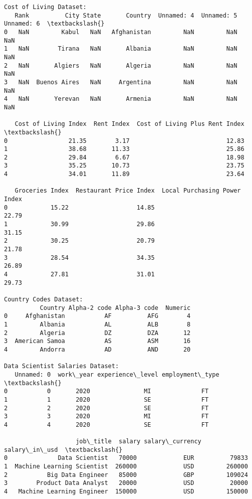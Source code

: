 \documentclass[11pt]{article}
\begin{document}
    \begin{Verbatim}[commandchars=\\\{\}]
Cost of Living Dataset:
   Rank          City State       Country  Unnamed: 4  Unnamed: 5  Unnamed: 6  \textbackslash{}
0   NaN         Kabul   NaN   Afghanistan         NaN         NaN         NaN
1   NaN        Tirana   NaN       Albania         NaN         NaN         NaN
2   NaN       Algiers   NaN       Algeria         NaN         NaN         NaN
3   NaN  Buenos Aires   NaN     Argentina         NaN         NaN         NaN
4   NaN       Yerevan   NaN       Armenia         NaN         NaN         NaN

   Cost of Living Index  Rent Index  Cost of Living Plus Rent Index  \textbackslash{}
0                 21.35        3.17                           12.83
1                 38.68       11.33                           25.86
2                 29.84        6.67                           18.98
3                 35.25       10.73                           23.75
4                 34.01       11.89                           23.64

   Groceries Index  Restaurant Price Index  Local Purchasing Power Index
0            15.22                   14.85                         22.79
1            30.99                   29.86                         31.15
2            30.25                   20.79                         21.78
3            28.54                   34.35                         26.89
4            27.81                   31.01                         29.73

Country Codes Dataset:
          Country Alpha-2 code Alpha-3 code  Numeric
0     Afghanistan           AF          AFG        4
1         Albania           AL          ALB        8
2         Algeria           DZ          DZA       12
3  American Samoa           AS          ASM       16
4         Andorra           AD          AND       20

Data Scientist Salaries Dataset:
   Unnamed: 0  work\_year experience\_level employment\_type  \textbackslash{}
0           0       2020               MI              FT
1           1       2020               SE              FT
2           2       2020               SE              FT
3           3       2020               MI              FT
4           4       2020               SE              FT

                    job\_title  salary salary\_currency  salary\_in\_usd  \textbackslash{}
0              Data Scientist   70000             EUR          79833
1  Machine Learning Scientist  260000             USD         260000
2           Big Data Engineer   85000             GBP         109024
3        Product Data Analyst   20000             USD          20000
4   Machine Learning Engineer  150000             USD         150000


\end{Verbatim}
\end{document}
